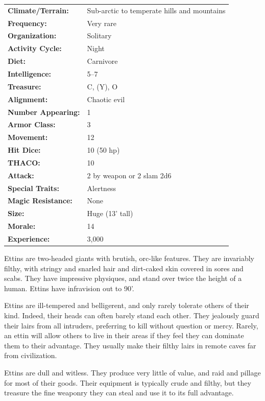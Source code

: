 \begin{multicols}{2}
\begin{minipage}{\columnwidth}
\noindent \begin{tabular}{p{}p{}}
\textbf{Climate/Terrain:}	& Sub-arctic to temperate hills and mountains \\
\textbf{Frequency:} 		& Very rare \\
\textbf{Organization:} 		& Solitary \\
\textbf{Activity Cycle:} 	& Night \\
\textbf{Diet:} 				& Carnivore \\
\textbf{Intelligence:} 		& 5--7 \\
\textbf{Treasure:} 			& C, (Y), O \\
\textbf{Alignment:} 		& Chaotic evil \\
\hline
\textbf{Number Appearing:} 	& 1 \\
\textbf{Armor Class:} 		& 3 \\
\textbf{Movement:} 			& 12 \\
\textbf{Hit Dice:} 			& 10 (50 hp) \\
\textbf{THACO:} 			& 10 \\
\textbf{Attack:} 			& 2 by weapon or 2 slam 2d6 \\
\textbf{Special Traits:} 	& Alertness \\
\textbf{Magic Resistance:} 	& None \\
\textbf{Size:} 				& Huge (13' tall) \\
\textbf{Morale:} 			& 14 \\
\textbf{Experience:} 		& 3,000 \\ %
\end{tabular}

\end{minipage}

Ettins are two-headed giants with brutish, orc-like features. They are invariably filthy, with stringy and snarled hair and dirt-caked skin covered in sores and scabs. They have impressive physiques, and stand over twice the height of a human. Ettins have infravision out to 90'.

Ettins are ill-tempered and belligerent, and only rarely tolerate others of their kind. Indeed, their heads can often barely stand each other. They jealously guard their lairs from all intruders, preferring to kill without question or mercy. Rarely, an ettin will allow others to live in their areas if they feel they can dominate them to their advantage. They usually make their filthy lairs in remote caves far from civilization.

Ettins are dull and witless. They produce very little of value, and raid and pillage for most of their goods. Their equipment is typically crude and filthy, but they treasure the fine weaponry they can steal and use it to its full advantage.


\end{multicols}
